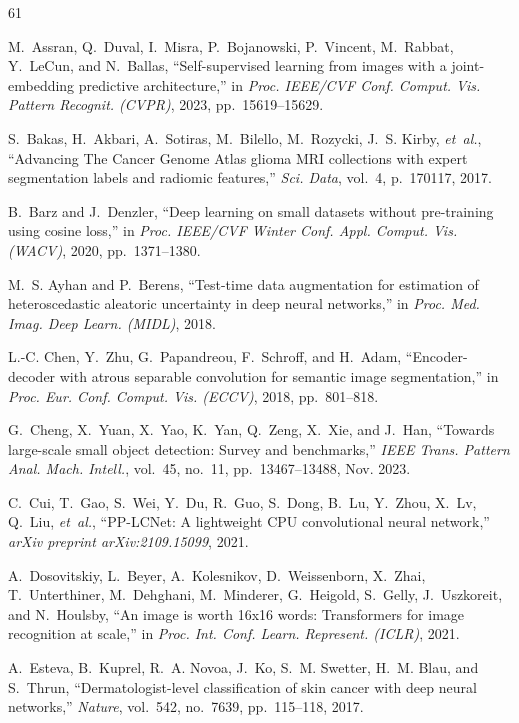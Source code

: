 \begin{thebibliography}{61}

M.~Assran, Q.~Duval, I.~Misra, P.~Bojanowski, P.~Vincent, M.~Rabbat, Y.~LeCun, and N.~Ballas, ``Self-supervised learning from images with a joint-embedding predictive architecture,'' in \emph{Proc. IEEE/CVF Conf. Comput. Vis. Pattern Recognit. (CVPR)}, 2023, pp.~15619--15629.

S.~Bakas, H.~Akbari, A.~Sotiras, M.~Bilello, M.~Rozycki, J.~S. Kirby, \emph{et~al.}, ``Advancing The Cancer Genome Atlas glioma MRI collections with expert segmentation labels and radiomic features,'' \emph{Sci. Data}, vol.~4, p.~170117, 2017. 

B.~Barz and J.~Denzler, ``Deep learning on small datasets without pre-training using cosine loss,'' in \emph{Proc. IEEE/CVF Winter Conf. Appl. Comput. Vis. (WACV)}, 2020, pp.~1371--1380.

M.~S. Ayhan and P.~Berens, ``Test-time data augmentation for estimation of heteroscedastic aleatoric uncertainty in deep neural networks,'' in \emph{Proc. Med. Imag. Deep Learn. (MIDL)}, 2018.

L.-C. Chen, Y.~Zhu, G.~Papandreou, F.~Schroff, and H.~Adam, ``Encoder-decoder with atrous separable convolution for semantic image segmentation,'' in \emph{Proc. Eur. Conf. Comput. Vis. (ECCV)}, 2018, pp.~801--818.

G.~Cheng, X.~Yuan, X.~Yao, K.~Yan, Q.~Zeng, X.~Xie, and J.~Han, ``Towards large-scale small object detection: Survey and benchmarks,'' \emph{IEEE Trans. Pattern Anal. Mach. Intell.}, vol.~45, no.~11, pp.~13467--13488, Nov. 2023. 

C.~Cui, T.~Gao, S.~Wei, Y.~Du, R.~Guo, S.~Dong, B.~Lu, Y.~Zhou, X.~Lv, Q.~Liu, \emph{et~al.}, ``PP-LCNet: A lightweight CPU convolutional neural network,'' \emph{arXiv preprint arXiv:2109.15099}, 2021.

A.~Dosovitskiy, L.~Beyer, A.~Kolesnikov, D.~Weissenborn, X.~Zhai, T.~Unterthiner, M.~Dehghani, M.~Minderer, G.~Heigold, S.~Gelly, J.~Uszkoreit, and N.~Houlsby, ``An image is worth 16x16 words: Transformers for image recognition at scale,'' in \emph{Proc. Int. Conf. Learn. Represent. (ICLR)}, 2021.

A.~Esteva, B.~Kuprel, R.~A. Novoa, J.~Ko, S.~M. Swetter, H.~M. Blau, and S.~Thrun, ``Dermatologist-level classification of skin cancer with deep neural networks,'' \emph{Nature}, vol.~542, no.~7639, pp.~115--118, 2017. 


\end{thebibliography}
